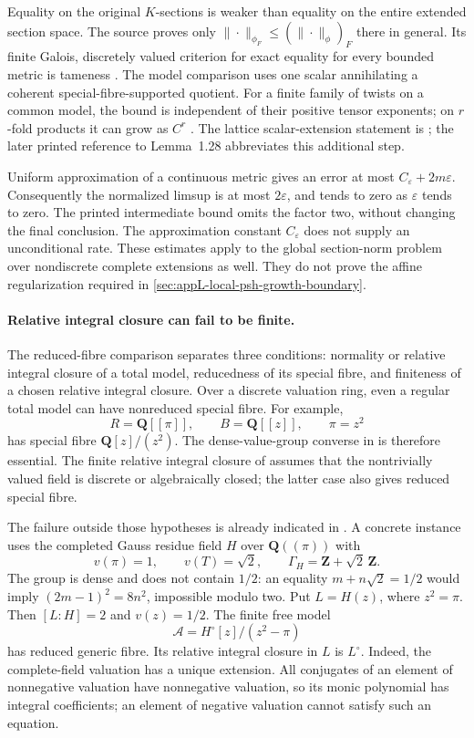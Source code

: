 Equality on the original \(K\)-sections is weaker than equality on
the entire extended section space.  The source proves only
\(\|\cdot\|_{\phi_F}\le(\|\cdot\|_\phi)_F\) there in general.
Its finite Galois, discretely valued criterion for exact equality
for every bounded metric is tameness
\cite[Lemmas~6.1--6.2]{BE21}.
The model comparison uses one scalar annihilating a coherent
special-fibre-supported quotient.  For a finite family of twists
on a common model, the bound is independent of their positive
tensor exponents; on \(r\)-fold products it can grow as \(C^r\)
\cite[Theorems~6.4--6.5]{BE21}.
The lattice scalar-extension statement is
\cite[Lemma~1.29(iv)]{BE21}; the later printed reference to
Lemma~1.28 abbreviates this additional step.

Uniform approximation of a continuous metric gives an error
at most \(C_\varepsilon+2m\varepsilon\).
Consequently the normalized limsup is at most \(2\varepsilon\),
and tends to zero as \(\varepsilon\) tends to zero.
The printed intermediate bound omits the factor two, without
changing the final conclusion.  The approximation constant
\(C_\varepsilon\) does not supply an unconditional rate.
These estimates apply to the global section-norm problem over
nondiscrete complete extensions as well.  They do not prove
the affine regularization required in
\cref{sec:appL-local-psh-growth-boundary}.

\paragraph{Relative integral closure can fail to be finite.}
The reduced-fibre comparison separates three conditions:
normality or relative integral closure of a total model,
reducedness of its special fibre, and finiteness of a chosen
relative integral closure.
Over a discrete valuation ring, even a regular total model can
have nonreduced special fibre.  For example,
\[
 R=\mathbf Q[[\pi]],\qquad B=\mathbf Q[[z]],\qquad \pi=z^2
\]
has special fibre \(\mathbf Q[z]/(z^2)\).
The dense-value-group converse in
\cite[Theorem~4.19]{BE21} is therefore essential.
The finite relative integral closure of
\cite[Theorem~4.20]{BE21} assumes that the nontrivially valued
field is discrete or algebraically closed; the latter case
also gives reduced special fibre.

The failure outside those hypotheses is already indicated in
\cite[Remark~4.21]{BE21}.  A concrete instance uses the completed
Gauss residue field \(H\) over \(\mathbf Q((\pi))\) with
\[
 v(\pi)=1,\qquad v(T)=\sqrt2,\qquad
 \Gamma_H=\mathbf Z+\sqrt2\,\mathbf Z.
\]
The group is dense and does not contain \(1/2\):
an equality \(m+n\sqrt2=1/2\) would imply
\((2m-1)^2=8n^2\), impossible modulo two.
Put \(L=H(z)\), where \(z^2=\pi\).
Then \([L:H]=2\) and \(v(z)=1/2\).
The finite free model
\[
 \mathscr A=H^\circ[z]/(z^2-\pi)
\]
has reduced generic fibre.  Its relative integral closure in \(L\)
is \(L^\circ\).  Indeed, the complete-field valuation has a unique
extension.  All conjugates of an element of nonnegative valuation
have nonnegative valuation, so its monic polynomial has integral
coefficients; an element of negative valuation cannot satisfy such
an equation.

